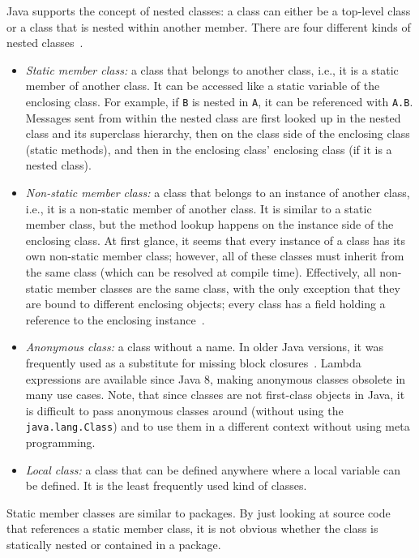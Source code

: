 Java supports the concept of nested classes: a class can either be a top-level class or a class that is nested within another member. There are four different kinds of nested classes~\cite{Bloch:2008:EJ:1377533}.
\begin{itemize}
	\item \emph{Static member class:} a class that belongs to another class, i.e., it is a static member of another class. It can be accessed like a static variable of the enclosing class. For example, if \texttt{B} is nested in \texttt{A}, it can be referenced with \texttt{A.B}. Messages sent from within the nested class are first looked up in the nested class and its superclass hierarchy, then on the class side of the enclosing class (static methods), and then in the enclosing class' enclosing class (if it is a nested class).
	\item \emph{Non-static member class:} a class that belongs to an instance of another class, i.e., it is a non-static member of another class. It is similar to a static member class, but the method lookup happens on the instance side of the enclosing class. At first glance, it seems that every instance of a class has its own non-static member class; however, all of these classes must inherit from the same class (which can be resolved at compile time). Effectively, all non-static member classes are the same class, with the only exception that they are bound to different enclosing objects; every class has a field holding a reference to the enclosing instance~\cite{Flanagan:2005:JNE:1237908}.
	\item \emph{Anonymous class:} a class without a name. In older Java versions, it was frequently used as a substitute for missing block closures~\cite{sandu1999lambda}. Lambda expressions are available since Java 8, making anonymous classes obsolete in many use cases. Note, that since classes are not first-class objects in Java, it is difficult to pass anonymous classes around (without using the \texttt{java.lang.Class}) and to use them in a different context without using meta programming.
	\item \emph{Local class:} a class that can be defined anywhere where a local variable can be defined. It is the least frequently used kind of classes.
\end{itemize}

Static member classes are similar to packages. By just looking at source code that references a static member class, it is not obvious whether the class is statically nested or contained in a package.

